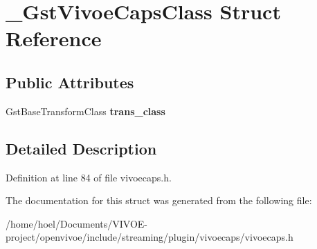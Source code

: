 \hypertarget{struct__GstVivoeCapsClass}{}\section{\+\_\+\+Gst\+Vivoe\+Caps\+Class Struct Reference}
\label{struct__GstVivoeCapsClass}
\subsection*{Public Attributes}
\begin{DoxyCompactItemize}
\item 
Gst\+Base\+Transform\+Class {\bfseries trans\+\_\+class}\hypertarget{struct__GstVivoeCapsClass_a941f8af289182a2a363147bf99f8da5d}{}\label{struct__GstVivoeCapsClass_a941f8af289182a2a363147bf99f8da5d}

\end{DoxyCompactItemize}


\subsection{Detailed Description}


Definition at line 84 of file vivoecaps.\+h.



The documentation for this struct was generated from the following file\+:\begin{DoxyCompactItemize}
\item 
/home/hoel/\+Documents/\+V\+I\+V\+O\+E-\/project/openvivoe/include/streaming/plugin/vivoecaps/vivoecaps.\+h\end{DoxyCompactItemize}
